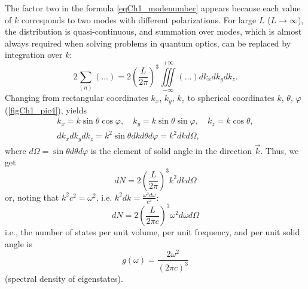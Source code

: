 The factor two in the formula \eqref{eqCh1_modenumber} appears because each value of $k$ corresponds to two modes with different polarizations. For large $L$ ($L \rightarrow \infty$), the distribution is quasi-continuous, and summation over modes, which is almost always required when solving problems in quantum optics, can be replaced by integration over $k$: 
\begin{equation}
2 \sum_{(n)} \left( \dots \right) = 2 \left(\frac{L}{2 \pi} \right)^3
\iiint\limits_{-\infty}^{+\infty} \left( \dots \right) d k_x d k_y d k_z.
\label{eqCh1_modenumber_kvazy_contig}
\end{equation}
Changing from rectangular coordinates $k_x$, $k_y$, $k_z$ to spherical coordinates  
$k$, $\theta$, $\varphi$ (\autoref{figCh1_pic4}), yields
\begin{eqnarray}
k_x = k \sin \theta \cos \varphi,
\quad 
k_y = k \sin \theta \sin \varphi,
\quad 
k_z  = k \cos \theta,
\nonumber \\
d k_x d k_y d k_z = k^2 \sin \theta d k d \theta d \varphi = k^2 d k
d \Omega,
\end{eqnarray}
where $d \Omega = \sin \theta d \theta d \varphi$ is the element of solid angle in the direction $\vec{k}$. Thus, we get
\begin{equation}
d N = 2 \left(\frac{L}{2 \pi} \right)^3 k^2 d k d \Omega
\label{eqCh1_modenumber_1pre}
\end{equation}
or, noting that $k^2 c^2 = \omega^2$, i.e. $k^2 d k =
\frac{\omega^2 d \omega}{c^3}$: 
\begin{equation}
d N = 2 \left(\frac{L}{2 \pi c} \right)^3 \omega^2 d \omega d \Omega
\label{eqCh1_modenumber_1}
\end{equation}
i.e., the number of states per unit volume, per unit frequency, and per unit solid angle is
\begin{equation}
g\left(\omega\right)  = \frac{2 \omega^2}{\left(2 \pi c\right)^3}
\end{equation}
(spectral density of eigenstates). 
